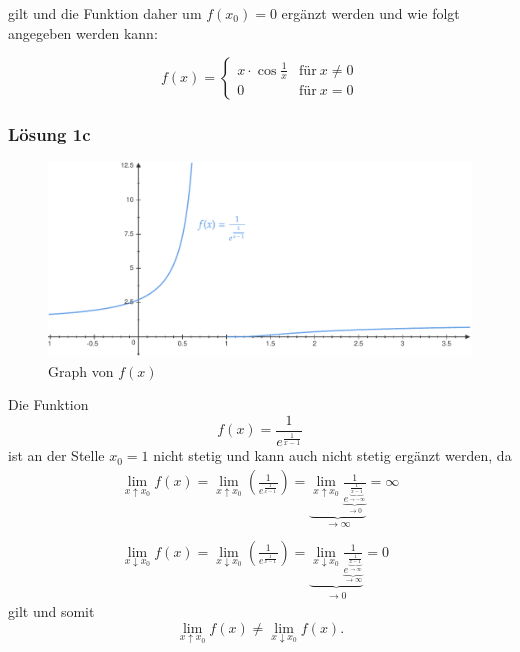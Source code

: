 \documentclass[main.tex]{subfiles}
\begin{document}
gilt und die Funktion daher um $f(x_0) = 0$ ergänzt werden und wie folgt angegeben werden kann:

\begin{equation*}
    f(x) = \begin{cases}
    x\cdot \cos\frac{1}{x} & \text{für} \ x\neq 0\\
    0 & \text{für} \ x=0
    \end{cases}
\end{equation*}

\subsubsection{Lösung 1c}
\begin{figure}[ht]
	\includegraphics[width=\linewidth]{fig-1c.pdf}
	\caption{Graph von $f(x)$}
\end{figure}

Die Funktion
\begin{equation*}
    f( x) =\frac{1}{e^{\frac{1}{x-1}}}
\end{equation*}
ist an der Stelle $x_{0} =1$ nicht stetig und kann auch nicht stetig ergänzt werden, da
\begin{gather*}
    \lim _{x\uparrow x_{0}} f( x) =\lim _{x\uparrow x_{0}}\left(\frac{1}{e^{\frac{1}{x-1}}}\right) =\underbrace{\lim\limits _{x\uparrow x_{0}}\frac{1}{\underbrace{e^{\underbrace{\frac{1}{x-1}}_{\rightarrow -\infty }}}_{\rightarrow 0}}}_{\rightarrow \infty } =\infty \\
    \\
    \lim _{x\downarrow x_{0}} f( x) =\lim _{x\downarrow x_{0}}\left(\frac{1}{e^{\frac{1}{x-1}}}\right) =\underbrace{\lim\limits _{x\downarrow x_{0}}\frac{1}{\underbrace{e^{\underbrace{\frac{1}{x-1}}_{\rightarrow \infty }}}_{\rightarrow \infty }}}_{\rightarrow 0} =0
\end{gather*}
gilt und somit
\begin{equation*}
    \lim _{x\uparrow x_{0}} f( x) \neq \lim _{x\downarrow x_{0}} f( x)\text{.}
\end{equation*}
\end{document}

